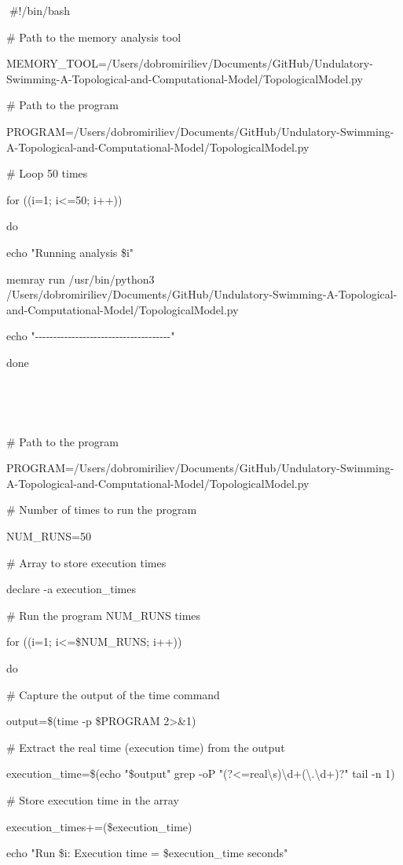 \#!/bin/bash

\# Path to the memory analysis tool

MEMORY\_TOOL=/Users/dobromiriliev/Documents/GitHub/Undulatory-Swimming-A-Topological-and-Computational-Model/TopologicalModel.py

\# Path to the program

PROGRAM=/Users/dobromiriliev/Documents/GitHub/Undulatory-Swimming-A-Topological-and-Computational-Model/TopologicalModel.py

\# Loop 50 times

for ((i=1; i\textless=50; i++))

do

echo "Running analysis \$i"

memray run /usr/bin/python3
/Users/dobromiriliev/Documents/GitHub/Undulatory-Swimming-A-Topological-and-Computational-Model/TopologicalModel.py

echo
"-\/-\/-\/-\/-\/-\/-\/-\/-\/-\/-\/-\/-\/-\/-\/-\/-\/-\/-\/-\/-\/-\/-\/-\/-\/-\/-\/-\/-\/-\/-\/-\/-\/-\/-\/-\/-"

done





\# Path to the program

PROGRAM=/Users/dobromiriliev/Documents/GitHub/Undulatory-Swimming-A-Topological-and-Computational-Model/TopologicalModel.py

\# Number of times to run the program

NUM\_RUNS=50

\# Array to store execution times

declare -a execution\_times

\# Run the program NUM\_RUNS times

for ((i=1; i\textless=\$NUM\_RUNS; i++))

do

\# Capture the output of the time command

output=\$(time -p \$PROGRAM 2\textgreater\&1)

\# Extract the real time (execution time) from the output

execution\_time=\$(echo "\$output" \textbar{} grep -oP
"(?\textless=real\textbackslash s)\textbackslash d+(\textbackslash.\textbackslash d+)?"
\textbar{} tail -n 1)

\# Store execution time in the array

execution\_times+=(\$execution\_time)

echo "Run \$i: Execution time = \$execution\_time seconds"

